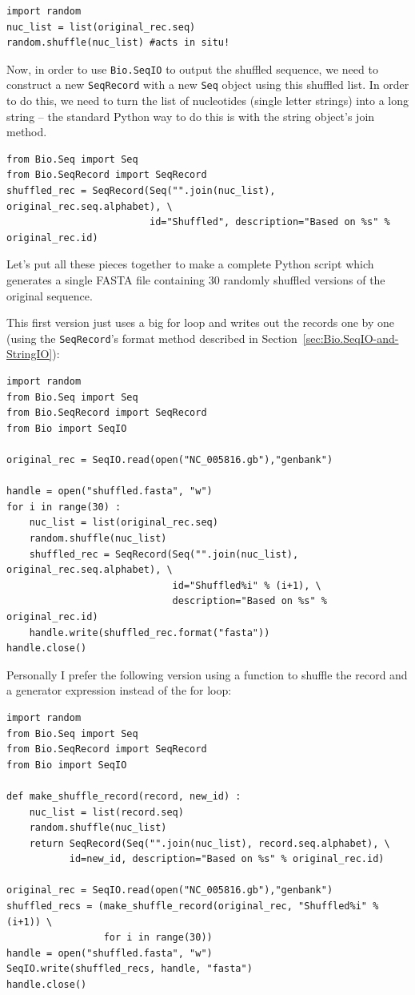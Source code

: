 \documentclass{report}
\begin{document}
\begin{verbatim}
import random
nuc_list = list(original_rec.seq)
random.shuffle(nuc_list) #acts in situ!
\end{verbatim}

Now, in order to use \verb|Bio.SeqIO| to output the shuffled sequence, we need
to construct a new \verb|SeqRecord| with a new \verb|Seq| object using this
shuffled list.  In order to do this, we need to turn the list of nucleotides
(single letter strings) into a long string -- the standard Python way to do
this is with the string object's join method.

\begin{verbatim}
from Bio.Seq import Seq
from Bio.SeqRecord import SeqRecord
shuffled_rec = SeqRecord(Seq("".join(nuc_list), original_rec.seq.alphabet), \
                         id="Shuffled", description="Based on %s" % original_rec.id)
\end{verbatim}

Let's put all these pieces together to make a complete Python script which
generates a single FASTA file containing 30 randomly shuffled versions of
the original sequence.

This first version just uses a big for loop and writes out the records one by one
(using the \verb|SeqRecord|'s format method described in
Section~\ref{sec:Bio.SeqIO-and-StringIO}):

\begin{verbatim}
import random
from Bio.Seq import Seq
from Bio.SeqRecord import SeqRecord
from Bio import SeqIO

original_rec = SeqIO.read(open("NC_005816.gb"),"genbank")

handle = open("shuffled.fasta", "w")
for i in range(30) :
    nuc_list = list(original_rec.seq)
    random.shuffle(nuc_list)
    shuffled_rec = SeqRecord(Seq("".join(nuc_list), original_rec.seq.alphabet), \
                             id="Shuffled%i" % (i+1), \
                             description="Based on %s" % original_rec.id)
    handle.write(shuffled_rec.format("fasta"))
handle.close()
\end{verbatim}

Personally I prefer the following version using a function to shuffle the record
and a generator expression instead of the for loop:

\begin{verbatim}
import random
from Bio.Seq import Seq
from Bio.SeqRecord import SeqRecord
from Bio import SeqIO

def make_shuffle_record(record, new_id) :
    nuc_list = list(record.seq)
    random.shuffle(nuc_list)
    return SeqRecord(Seq("".join(nuc_list), record.seq.alphabet), \
           id=new_id, description="Based on %s" % original_rec.id)
   
original_rec = SeqIO.read(open("NC_005816.gb"),"genbank")
shuffled_recs = (make_shuffle_record(original_rec, "Shuffled%i" % (i+1)) \
                 for i in range(30))
handle = open("shuffled.fasta", "w")
SeqIO.write(shuffled_recs, handle, "fasta")
handle.close()
\end{verbatim}
\end{document}
